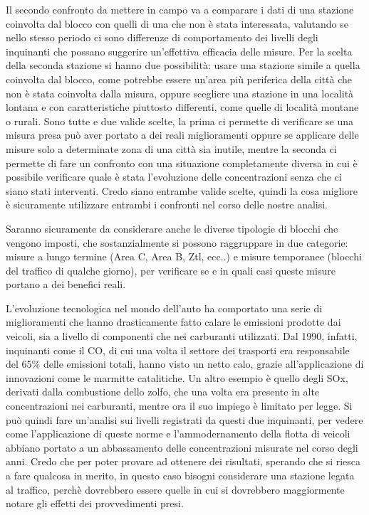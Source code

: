 \documentclass{article}
\begin{document}
Il secondo confronto da mettere in campo va a comparare i dati di una stazione coinvolta dal blocco con quelli di una che non è stata interessata, valutando se nello stesso periodo ci sono differenze di comportamento dei livelli degli inquinanti che possano suggerire un'effettiva efficacia delle misure.
Per la scelta della seconda stazione si hanno due possibilità: usare una stazione simile a quella coinvolta dal blocco, come potrebbe essere un'area più periferica della città che non è stata coinvolta dalla misura, oppure scegliere una stazione in una località lontana e con caratteristiche piuttosto differenti, come quelle di località montane o rurali. Sono tutte e due valide scelte, la prima ci permette di verificare se una misura presa può aver portato a dei reali miglioramenti oppure se applicare delle misure solo a determinate zona di una città sia inutile, mentre la seconda ci permette di fare un confronto con una situazione completamente diversa in cui è possibile verificare quale è stata l'evoluzione delle concentrazioni senza che ci siano stati interventi. Credo siano entrambe valide scelte, quindi la cosa migliore è sicuramente utilizzare entrambi i confronti nel corso delle nostre analisi.

Saranno sicuramente da considerare anche le diverse tipologie di blocchi che vengono imposti, che sostanzialmente si possono raggruppare in due categorie: misure a lungo termine (Area C, Area B, Ztl, ecc..) e misure temporanee (blocchi del traffico di qualche giorno), per verificare se e in quali casi queste misure portano a dei benefici reali. 

L'evoluzione tecnologica nel mondo dell'auto ha comportato una serie di miglioramenti che hanno drasticamente fatto calare le emissioni prodotte dai veicoli, sia a livello di componenti che nei carburanti utilizzati. Dal 1990, infatti, inquinanti come il CO, di cui una volta il settore dei trasporti era responsabile del 65\% delle emissioni totali, hanno visto un netto calo, grazie all'applicazione di innovazioni come le marmitte catalitiche. Un altro esempio è quello degli SOx, derivati dalla combustione dello zolfo, che una volta era presente in alte concentrazioni nei carburanti, mentre ora il suo impiego è limitato per legge. Si può quindi fare un'analisi sui livelli registrati da questi due inquinanti, per vedere come l'applicazione di queste norme e l'ammodernamento della flotta di veicoli abbiano portato a un abbassamento delle concentrazioni misurate nel corso degli anni. Credo che per poter provare ad ottenere dei risultati, sperando che si riesca a fare qualcosa in merito, in questo caso bisogni considerare una stazione legata al traffico, perchè dovrebbero essere quelle in cui si dovrebbero maggiormente notare gli effetti dei provvedimenti presi.
\end{document}
